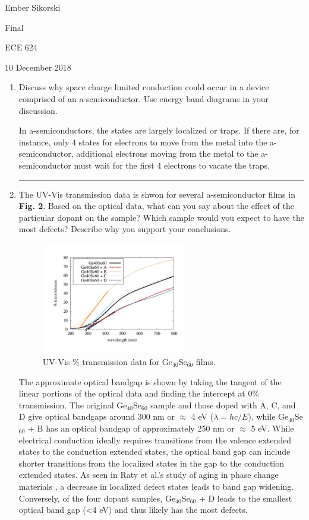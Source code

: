 \documentclass[12pt]{elsarticle}
\newcommand{\vs}{\vspace{2mm}}
\newcommand{\fullline}{\noindent\rule{14cm}{0.4pt} \vspace{4mm}}
\begin{document}
\begin{flushright}
	Ember Sikorski\par
	Final\par
	ECE 624\par 
	10 December 2018
\end{flushright}


\begin{enumerate}
\item Discuss why space charge limited conduction could occur in a device comprised of an
a-semiconductor. Use energy band diagrams in your discussion. 
\par 
\vs 
In a-semiconductors, the states are largely localized or traps. If there are, for instance, only 4 states for electrons to move from the metal into the a-semiconductor, additional electrons moving from the metal to the a-semiconductor must wait for the first 4 electrons to vacate the traps.

\fullline

\item The UV-Vis transmission data is shwon for several a-semiconductor films in \textbf{Fig. 2}. Based on the optical data, what can you say about the effect of the particular dopant on the sample? Which sample would you expect to have the most defects? Describe why you support your conclusions.

\begin{figure}[H]
	\centering
	\includegraphics[width=0.6\textwidth]{fig1}
	\caption{UV-Vis \% transmission data for Ge$_{40}$Se$_{60}$ films.}
\end{figure}
\par 

The approximate optical bandgap is shown by taking the tangent of the linear portions of the optical data and finding the intercept at 0\% transmission. The original Ge$_{40}$Se$_{60}$ sample and those doped with A, C, and D give optical bandgaps around 300 nm or $\approx$ 4 eV ($\lambda=hc/E$), while Ge$_{40}$Se$_{60}$ + B has an optical bandgap of approximately 250 nm or $\approx$ 5 eV. While electrical conduction ideally requires transitions from the valence extended states to the conduction extended states, the optical band gap can include shorter transitions from the localized states in the gap to the conduction extended states. As seen in Raty et al.'s study of aging in phase change materials \cite{Raty2015}, a decrease in localized defect states leads to band gap widening. Conversely, of the four dopant samples, Ge$_{40}$Se$_{60}$ + D leads to the smallest optical band gap (<4 eV) and thus likely has the most defects.


\end{enumerate}
\end{document}
